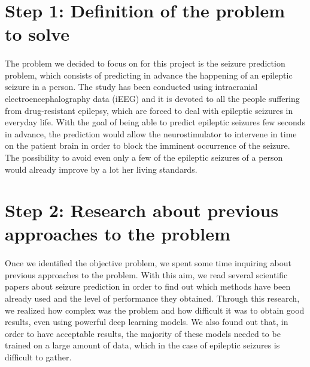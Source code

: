
\section{Step 1: Definition of the problem to solve} \label{sec: step_definition_problem_to_solve}
\paragraph{} The problem we decided to focus on for this project is the seizure prediction problem, which consists of predicting in advance the happening of an epileptic seizure in a person. The study has been conducted using intracranial electroencephalography data (iEEG) and it is devoted to all the people suffering from drug-resistant epilepsy, which are forced to deal with epileptic seizures in everyday life. With the goal of being able to predict epileptic seizures few seconds in advance, the prediction would allow the neurostimulator to intervene in time on the patient brain in order to block the imminent occurrence of the seizure. The possibility to avoid even only a few of the epileptic seizures of a person would already improve by a lot her living standards.


\section{Step 2: Research about previous approaches to the problem} \label{sec: step_research_about_previous_approaches}
\paragraph{} Once we identified the objective problem, we spent some time inquiring about previous approaches to the problem. With this aim, we read several scientific papers about seizure prediction in order to find out which methods have been already used and the level of performance they obtained. Through this research, we realized how complex was the problem and how difficult it was to obtain good results, even using powerful deep learning models. We also found out that, in order to have acceptable results, the majority of these models needed to be trained on a large amount of data, which in the case of epileptic seizures is difficult to gather.

